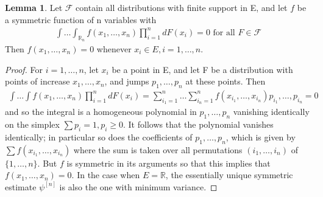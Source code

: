\documentclass{article}
\newcommand{\R}{{\mathbb{R}}}
\theoremstyle{definition}
\newtheorem{Lemma}{Lemma}
\numberwithin{Def}{section}
\begin{document}
\begin{itemize}
    \begin{Lemma}\label{lem A}
    Let $\mathcal{F}$ contain all distributions with finite support in E, and let $f$ be a symmetric function of n variables with 
    \begin{align*}
        \int \dotsc \int_{\R_n} f(x_1, \dotsc, x_n) \prod_{i=1}^n dF(x_i) = 0 \text{ for all } F \in \mathcal{F}
    \end{align*}
    Then $f(x_1, \dotsc, x_n) = 0$ whenever $x_i \in E, i = 1, \dotsc, n$. 
    \end{Lemma}
    \begin{proof}
    For $i = 1, \dotsc, n$, let $x_i$ be a point in E, and let F be a distribution with points of increase $x_1, \dotsc, x_n$, and jumps $p_1, \dotsc, p_n$ at these points. Then 
    \begin{align*}
        \int \dotsc \int f(x_1, \dotsc, x_n) \prod_{i=1}^n dF(x_i) = \sum_{i_1 = 1}^n \dotsc \sum_{i_n = 1}^n f(x_{i_1}, \dotsc, x_{i_n}) p_{i_1}, \dotsc, p_{i_n} = 0
    \end{align*}
    and so the integral is a homogeneous polynomial in $p_1, \dotsc, p_n$ vanishing identically on the simplex $\sum p_i = 1, p_i \geq 0$. It follows that the polynomial vanishes identically; in particular so does the coefficients of $p_1, \dotsc, p_n$, which is given by $\sum f(x_{i_1}, \dotsc, x_{i_n})$ where the sum is taken over all permutations $(i_1, \dotsc, i_n)$ of $\{1, \dotsc, n\}$. But $f$ is symmetric in its arguments so that this implies that $f(x_1, \dotsc, x_n) = 0$. In the case when $E = \R$, the essentially unique symmetric estimate $\psi^{[n]}$ is also the one with minimum variance.
    \end{proof}
    

\end{itemize}
\end{document}
